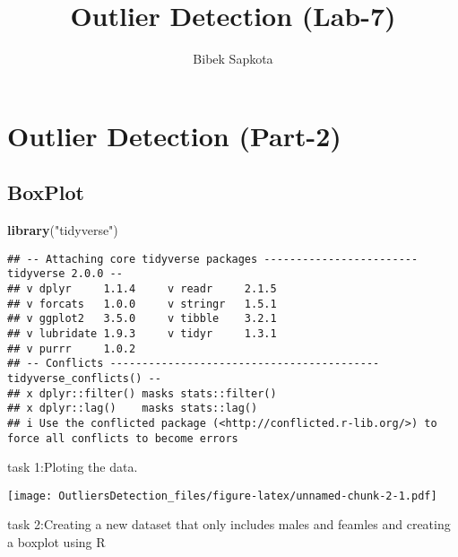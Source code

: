 \documentclass[
]{article}
\title{Outlier Detection (Lab-7)}
\author{Bibek Sapkota}
\date{}
\newenvironment{Shaded}{\begin{snugshade}}{\end{snugshade}}
\newcommand{\FunctionTok}[1]{\textcolor[rgb]{0.13,0.29,0.53}{\textbf{#1}}}
\newcommand{\NormalTok}[1]{#1}
\newcommand{\OtherTok}[1]{\textcolor[rgb]{0.56,0.35,0.01}{#1}}
\newcommand{\SpecialCharTok}[1]{\textcolor[rgb]{0.81,0.36,0.00}{\textbf{#1}}}
\newcommand{\StringTok}[1]{\textcolor[rgb]{0.31,0.60,0.02}{#1}}
\begin{document}
\maketitle

\hypertarget{outlier-detection-part-2}{%
\section{Outlier Detection (Part-2)}\label{outlier-detection-part-2}}

\hypertarget{boxplot}{%
\subsection{BoxPlot}\label{boxplot}}

\begin{Shaded}
\begin{Highlighting}[]
\FunctionTok{library}\NormalTok{(}\StringTok{"tidyverse"}\NormalTok{)}
\end{Highlighting}
\end{Shaded}

\begin{verbatim}
## -- Attaching core tidyverse packages ------------------------ tidyverse 2.0.0 --
## v dplyr     1.1.4     v readr     2.1.5
## v forcats   1.0.0     v stringr   1.5.1
## v ggplot2   3.5.0     v tibble    3.2.1
## v lubridate 1.9.3     v tidyr     1.3.1
## v purrr     1.0.2     
## -- Conflicts ------------------------------------------ tidyverse_conflicts() --
## x dplyr::filter() masks stats::filter()
## x dplyr::lag()    masks stats::lag()
## i Use the conflicted package (<http://conflicted.r-lib.org/>) to force all conflicts to become errors
\end{verbatim}

task 1:Ploting the data.

\begin{Shaded}
\end{Shaded}

\texttt{[image: OutliersDetection\_files/figure-latex/unnamed-chunk-2-1.pdf]}

task 2:Creating a new dataset that only includes males and feamles and
creating a boxplot using R

\begin{Shaded}
\end{Shaded}
\end{document}
